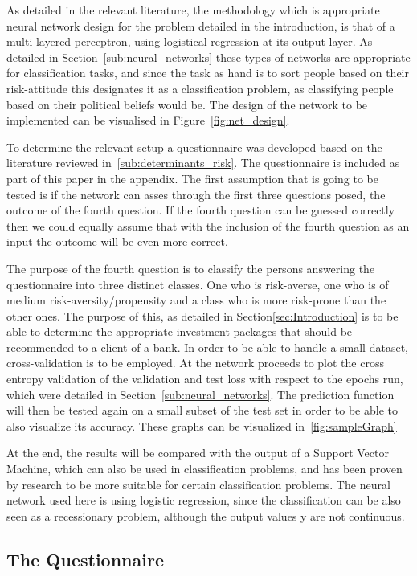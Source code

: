 \documentclass[12pt]{article}
\begin{document}
As detailed in the relevant literature, the methodology which is appropriate neural network design for the problem detailed in the introduction, is that of a multi-layered perceptron, using logistical regression at its output layer. As detailed in Section~\ref{sub:neural_networks} these types of networks are appropriate for classification tasks, and since the task as hand is to sort people based on their risk-attitude this designates it as a classification problem, as classifying people based on their political beliefs would be. The design of the network to be implemented can be visualised in Figure~\ref{fig:net_design}. 

To determine the relevant setup a questionnaire was developed based on the literature reviewed in~\ref{sub:determinants_risk}. The questionnaire is included as part of this paper in the appendix. The first assumption that is going to be tested is if the network can asses through the first three questions posed, the outcome of the fourth question. If the fourth question can be guessed correctly then we could equally assume that with the inclusion of the fourth question as an input the outcome will be even more correct. 

The purpose of the fourth question is to classify the persons answering the questionnaire into three distinct classes. One who is risk-averse, one who is of medium risk-aversity/propensity and a class who is more risk-prone than the other ones. The purpose of this, as detailed in Section\ref{sec:Introduction} is to be able to determine the appropriate investment packages that should be recommended to a client of a bank.
In order to be able to handle a small dataset, cross-validation is to be employed. At the network proceeds to plot the cross entropy validation of the validation and test loss with respect to the epochs run, which were detailed in Section~\ref{sub:neural_networks}. The prediction function will then be tested again on a small subset of the test set in order to be able to also visualize its accuracy. These graphs can be visualized in~\ref{fig:sampleGraph}

At the end, the results will be compared with the output of a Support Vector Machine, which can also be used in classification problems, and has been proven by research to be more suitable for certain classification problems. The neural network used here is using logistic regression, since the classification can be also seen as a recessionary problem, although the output values y are not continuous.
\subsection{The Questionnaire}
\end{document}
